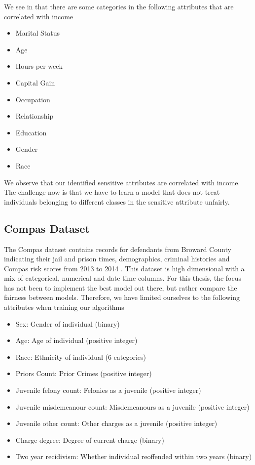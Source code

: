 We see  in that there are some categories in the following attributes that are correlated with income

\begin{itemize}
    \item Marital Status
    \item Age
    \item Hours per week
    \item Capital Gain
    \item Occupation
    \item Relationship
    \item Education
    \item Gender
    \item Race
\end{itemize}

We observe that our identified sensitive attributes are correlated with income. The challenge now is that we have to learn a model that does not treat individuals belonging to different classes in the sensitive attribute unfairly.

\subsection{Compas Dataset}
The Compas dataset contains records for defendants from Broward County indicating their jail and prison times, demographics, criminal histories and Compas risk scores from 2013 to 2014 \cite{Mehrabi:2021:CSUR}. This dataset is high dimensional with a mix of categorical, numerical and date time columns. For this thesis, the focus has not been to implement the best model out there, but rather compare the fairness between models. Therefore, we have limited ourselves to the following attributes when training our algorithms

\begin{itemize}
    \item Sex: Gender of individual (binary)
    \item Age: Age of individual (positive integer)
    \item Race: Ethnicity of individual (6 categories)
    \item Priors Count: Prior Crimes (positive integer)
    \item Juvenile felony count: Felonies as a juvenile (positive integer)
    \item Juvenile misdemeanour count: Misdemeanours as a juvenile (positive integer)
    \item Juvenile other count: Other charges as a juvenile (positive integer)
    \item Charge degree: Degree of current charge (binary)
    \item Two year recidivism: Whether individual reoffended within two years (binary)
\end{itemize}


